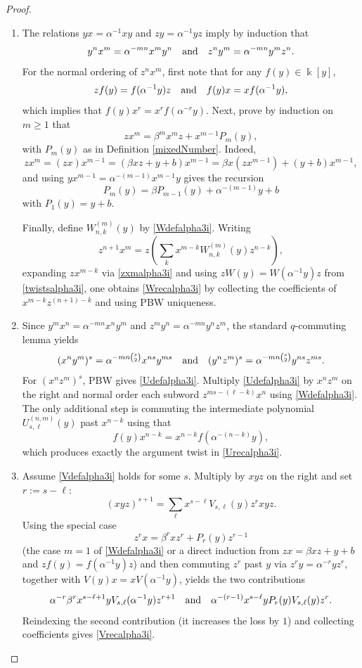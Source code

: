 \documentclass{amsart}
\theoremstyle{definition}
\theoremstyle{remark}
\numberwithin{equation}{section}
\begin{document}
\begin{proof}
\begin{enumerate}
\item [\rm (1)] The relations $yx=\alpha^{-1}xy$ and $zy=\alpha^{-1}yz$ imply by induction that 
$$
y^n x^m=\alpha^{-mn}x^m y^n \quad {\rm and} \quad z^n y^m=\alpha^{-mn}y^m z^n.
$$
For the normal ordering of $z^n x^m$, first note that for any $f(y)\in\Bbbk[y]$,
\begin{equation}\label{twistsalpha3i}
z f(y)=f(\alpha^{-1}y) z \quad {\rm and} \quad f(y) x=x f(\alpha^{-1}y),
\end{equation}
which implies that $f(y)x^r = x^r f(\alpha^{-r}y)$.
Next, prove by induction on $m\ge 1$ that
\begin{equation}\label{zxmalpha3i}
zx^m=\beta^m x^m z+x^{m-1}P_m(y),
\end{equation}
with $P_m(y)$ as in Definition \ref{mixedNumber}. Indeed,
\[
zx^m=(zx)x^{m-1}=(\beta xz+y+b)x^{m-1} =\beta x(zx^{m-1})+(y+b)x^{m-1},
\]
and using $y x^{m-1}=\alpha^{-(m-1)}x^{m-1}y$ gives the recursion
$$
P_m(y) = \beta P_{m-1}(y)+\alpha^{-(m-1)}y + b
$$ 
with $P_1(y) = y+b$.

Finally, define $W^{(m)}_{n,k}(y)$ by \eqref{Wdefalpha3i}. Writing
$$
z^{n+1}x^m = z\left(\sum_k x^{m-k}W^{(m)}_{n,k}(y)z^{n-k}\right),
$$ 
expanding $z x^{m-k}$ via \eqref{zxmalpha3i} and using $zW(y)=W(\alpha^{-1}y)z$ from \eqref{twistsalpha3i}, one obtains \eqref{Wrecalpha3i} by collecting the coefficients of $x^{m-k}z^{(n+1)-k}$ and using PBW uniqueness.

\item [\rm (2)] Since $y^m x^n=\alpha^{-mn}x^n y^m$ and $z^m y^n=\alpha^{-mn}y^n z^m$, the standard $q$-commuting lemma
yields
\[
(x^n y^m)^s=\alpha^{-mn\binom{s}{2}}x^{ns}y^{ms} \quad {\rm and} \quad (y^n z^m)^s=\alpha^{-mn\binom{s}{2}}y^{ns}z^{ms}.
\]
For $(x^n z^m)^s$, PBW gives \eqref{Udefalpha3i}. Multiply \eqref{Udefalpha3i} by $x^n z^m$ on the right and normal order each subword $z^{ms-(\ell-k)}x^n$ using \eqref{Wdefalpha3i}. The only additional step is commuting the intermediate polynomial $U^{(n,m)}_{s,\ell}(y)$ past $x^{n-k}$ using that
$$
f(y)x^{n-k}=x^{n-k}f(\alpha^{-(n-k)}y),
$$
which produces exactly the argument twist in \eqref{Urecalpha3i}.

\item [\rm (3)] Assume \eqref{Vdefalpha3i} holds for some $s$. Multiply by $xyz$ on the right and set $r:=s-\ell$:
\[
(xyz)^{s+1}=\sum_{\ell}x^{s-\ell}V_{s,\ell}(y) z^{r}xyz.
\]
Using the special case 
$$
z^{r}x=\beta^{r}x z^{r}+P_r(y)z^{r-1}
$$ 
(the case $m=1$ of \eqref{Wdefalpha3i} or a direct induction from $zx=\beta xz+y+b$ and $z f(y)=f(\alpha^{-1}y)z$) and then commuting $z^r$ past $y$ via $z^r y=\alpha^{-r}y z^r$, together with $V(y)x=xV(\alpha^{-1}y)$, yields the two contributions
\[
\alpha^{-r}\beta^{r} x^{s-\ell+1}yV_{s,\ell}(\alpha^{-1}y)z^{r+1} 
\quad {\rm and} \quad \alpha^{-(r-1)}x^{s-\ell}yP_r(y)V_{s,\ell}(y)z^{r}.
\]
Reindexing the second contribution (it increases the loss by $1$) and collecting coefficients gives \eqref{Vrecalpha3i}.


\end{enumerate}
\end{proof}
\end{document}
